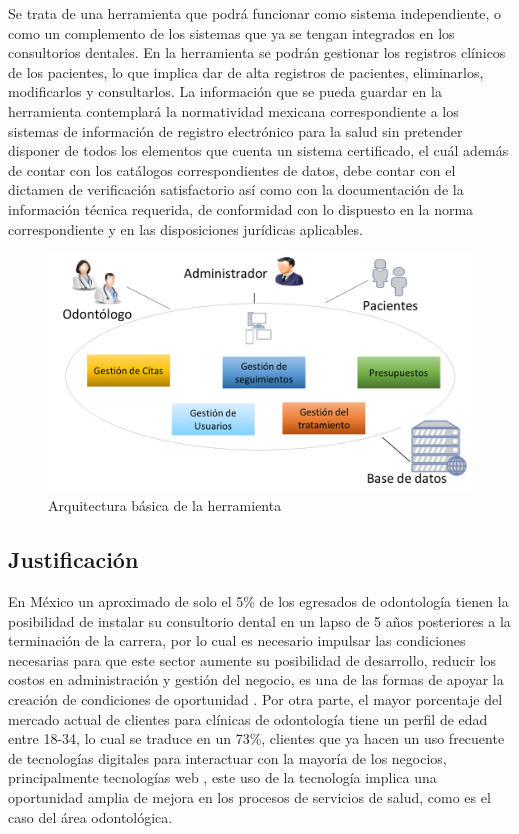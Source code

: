 \vspace{1em}

Se trata de una herramienta que podrá funcionar como sistema independiente, o como un complemento de los sistemas que ya se tengan integrados en los consultorios dentales. En la herramienta se podrán gestionar los registros clínicos de los pacientes, lo que implica dar de alta registros de pacientes, eliminarlos, modificarlos y consultarlos. La información que se pueda guardar en la herramienta contemplará la normatividad mexicana correspondiente a los sistemas de información de registro electrónico para la salud sin pretender disponer de todos los elementos que cuenta un sistema certificado, el cuál además de contar con los catálogos correspondientes de datos, debe contar con el dictamen de verificación satisfactorio así como con la documentación de la información técnica requerida, de conformidad con lo dispuesto en la norma correspondiente y en las disposiciones jurídicas aplicables.

\begin{figure}[H]
\centering
\includegraphics[width=12cm, keepaspectratio]{pictures/diagrama-protocolo.png}
\caption{Arquitectura básica de la herramienta}
\end{figure}

\subsection{Justificación}
En México un aproximado de solo el 5\% de los egresados de odontología tienen la posibilidad de instalar su consultorio dental en un lapso de 5 años posteriores a la terminación de la carrera, por lo cual es necesario impulsar las condiciones necesarias para que este sector aumente su posibilidad de desarrollo, reducir los costos en administración y gestión del negocio, es una de las formas de apoyar la creación de condiciones de oportunidad \cite{E01}.  Por otra parte, el mayor porcentaje del mercado actual de clientes para clínicas de odontología tiene un perfil de edad entre 18-34, lo cual se traduce en un 73\%, clientes que ya hacen un uso frecuente de tecnologías digitales para interactuar con la mayoría de los negocios, principalmente tecnologías web \cite{E02}, este uso de la tecnología implica una oportunidad amplia de mejora en los procesos de servicios de salud, como es el caso del área odontológica.


